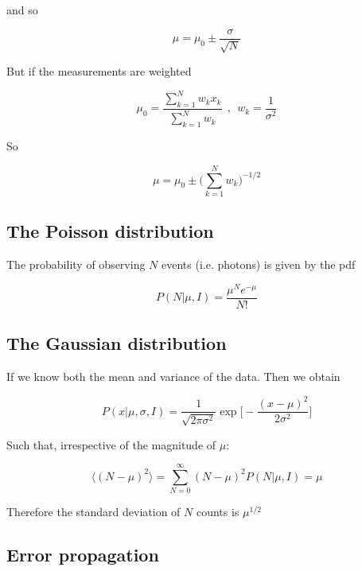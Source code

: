 \documentclass[a4paper]{article}
\begin{document}
and so

\begin{equation*}
    \mu=\mu_0\pm\frac{\sigma}{\sqrt{N}}
\end{equation*}

But if the measurements are weighted

\begin{equation*}
    \mu_0=\frac{\sum_{k=1}^{N}w_kx_k}{\sum_{k=1}^{N}w_k}\ \ , \ \ w_k=\frac{1}{\sigma^2}
\end{equation*}

So

\begin{equation*}
    \mu=\mu_0\pm\bigg(\sum_{k=1}^{N}w_k\bigg)^{-1/2}
\end{equation*}

\subsection{The Poisson distribution}

The probability of observing $N$ events (i.e. photons) is given by the pdf

\begin{equation*}
    P(N|\mu,I)=\frac{\mu^Ne^{-\mu}}{N!}
\end{equation*}

\subsection{The Gaussian distribution}

If we know both the mean and variance of the data. Then we obtain 

\begin{equation*}
    P(x|\mu, \sigma, I)=\frac{1}{\sqrt{2\pi\sigma^2}}\exp{\bigg[-\frac{(x-\mu)^2}{2\sigma^2}\bigg]}
\end{equation*}

Such that, irrespective of the magnitude of $\mu$:

\begin{equation*}
    \langle (N-\mu)^2 \rangle=\sum_{N=0}^{\infty}(N-\mu)^2P(N|\mu,I)=\mu
\end{equation*}

Therefore the standard deviation of $N$ counts is $\mu^{1/2}$

\subsection{Error propagation}
\end{document}
